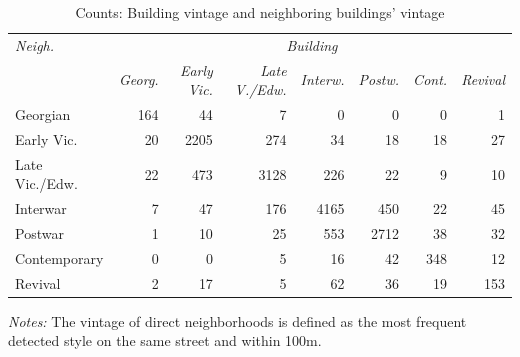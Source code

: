 \documentclass[]{article}
\begin{document}
\begin{table}[ht]
\caption{Counts: Building vintage and neighboring buildings' vintage}
\label{tab:vintneigh}
\centering
\begin{tabular}{lrrrrrrr}
\toprule
\emph{Neigh.} & \multicolumn{7}{c}{\emph{Building}} \\
 \cmidrule(lr){1-1}
 \cmidrule(lr){2-8}
& \emph{Georg.} & \emph{Early Vic.} & \emph{Late V./Edw.} & \emph{Interw.} & \emph{Postw.} & \emph{Cont.} & \emph{Revival} \\ 
  \cmidrule(lr){2-8}
Georgian & 164 &  44 &   7 &   0 &   0 &   0 &   1 \\ 
  Early Vic. &  20 & 2205 & 274 &  34 &  18 &  18 &  27 \\ 
  Late Vic./Edw. &  22 & 473 & 3128 & 226 &  22 &   9 &  10 \\ 
  Interwar &   7 &  47 & 176 & 4165 & 450 &  22 &  45 \\ 
  Postwar &   1 &  10 &  25 & 553 & 2712 &  38 &  32 \\ 
  Contemporary &   0 &   0 &   5 &  16 &  42 & 348 &  12 \\ 
  Revival &   2 &  17 &   5 &  62 &  36 &  19 & 153 \\ 
   \bottomrule
\end{tabular}
\begin{minipage}{\textwidth}
\vspace{0.25cm}
\footnotesize \emph{Notes:} The vintage of direct neighborhoods is defined as the most frequent detected style on the same street and within 100m. 
\end{minipage}
\end{table}
\end{document}
